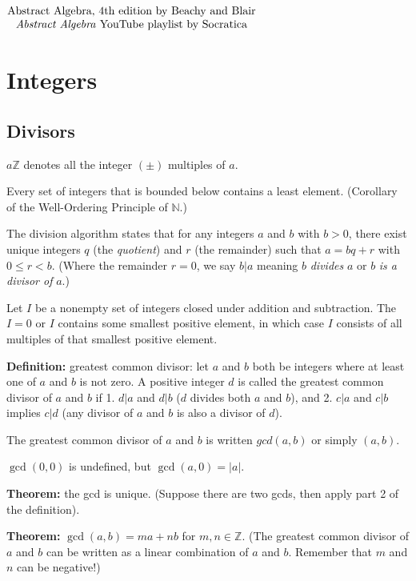 \documentclass[12pt]{article}
\begin{document}
\begin{center}

$
\begin{matrix}
\text{Abstract Algebra, 4th edition by Beachy and Blair}\\
\text{\textit{Abstract Algebra} YouTube playlist by Socratica}
\end{matrix}
$

\end{center}

\section{Integers}

\subsection{Divisors}

$ a\mathbb{Z}$ denotes all the integer $(\pm)$ multiples of $a$.

Every set of integers that is bounded below contains a least element. (Corollary of the Well-Ordering Principle of $\mathbb{N}$.)

The division algorithm states that for any integers $a$ and $b$ with $b > 0$, there exist unique integers $q$ (the \textit{quotient}) and $r$ (the remainder) such that $a = bq + r$ with $ 0 \leq r < b$. (Where the remainder $r = 0$, we say $b | a$ meaning $b$ \textit{divides} $a$ or $b$ \textit{is a divisor of} $a$.)

Let $I$ be a nonempty set of integers closed under addition and subtraction. The $I = {0}$ or $I$ contains some smallest positive element, in which case $I$ consists of all multiples of that smallest positive element.

\textbf{Definition:} greatest common divisor: let $a$ and $b$ both be integers where at least one of $a$ and $b$ is not zero. A positive integer $d$ is called the greatest common divisor of $a$ and $b$ if 1. $d|a$ and $d|b$ ($d$ divides both $a$ and $b$), and 2. $c|a$ and $c|b$ implies $c|d$ (any divisor of $a$ and $b$ is also a divisor of $d$).

The greatest common divisor of $a$ and $b$ is written $gcd(a, b)$ or simply $(a, b)$.

$\gcd(0,0)$ is undefined, but $\gcd(a,0)=|a|$.

\textbf{Theorem:} the gcd is unique. (Suppose there are two gcds, then apply part 2 of the definition).

\textbf{Theorem:} $\gcd(a,b) = ma + nb$ for $m, n \in \mathbb{Z}$. (The greatest common divisor of $a$ and $b$ can be written as a linear combination of $a$ and $b$. Remember that $m$ and $n$ can be negative!)
\end{document}
